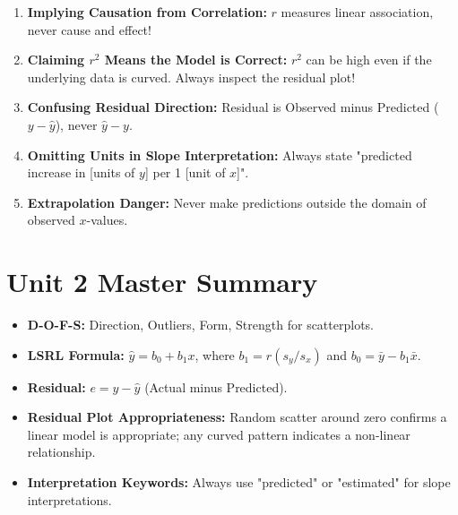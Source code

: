 \begin{trapbox}
\begin{enumerate}[leftmargin=1.2em]
  \item \textbf{Implying Causation from Correlation:} $r$ measures linear association, never cause and effect!
  \item \textbf{Claiming $r^2$ Means the Model is Correct:} $r^2$ can be high even if the underlying data is curved. Always inspect the residual plot!
  \item \textbf{Confusing Residual Direction:} Residual is Observed minus Predicted ($y - \hat{y}$), never $\hat{y} - y$.
  \item \textbf{Omitting Units in Slope Interpretation:} Always state "predicted increase in [units of $y$] per 1 [unit of $x$]".
  \item \textbf{Extrapolation Danger:} Never make predictions outside the domain of observed $x$-values.
\end{enumerate}
\end{trapbox}
\section{Unit 2 Master Summary}
\begin{lessonbox}
\begin{itemize}[leftmargin=1.2em]
  \item \textbf{D-O-F-S:} Direction, Outliers, Form, Strength for scatterplots.
  \item \textbf{LSRL Formula:} $\hat{y} = b_0 + b_1 x$, where $b_1 = r(s_y/s_x)$ and $b_0 = \bar{y} - b_1\bar{x}$.
  \item \textbf{Residual:} $e = y - \hat{y}$ (Actual minus Predicted).
  \item \textbf{Residual Plot Appropriateness:} Random scatter around zero confirms a linear model is appropriate; any curved pattern indicates a non-linear relationship.
  \item \textbf{Interpretation Keywords:} Always use "predicted" or "estimated" for slope interpretations.
\end{itemize}
\end{lessonbox}
\clearpage
